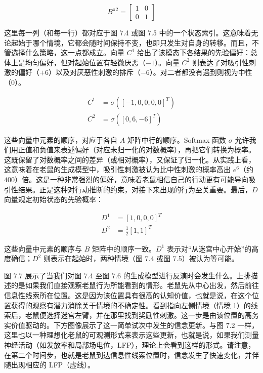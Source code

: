 \begin{equation}
B^{\pi 2}=
\begin{bmatrix}
1 & 0 \\
0 & 1
\end{bmatrix}
\label{eq:chapter7-context}
\end{equation}

这里每一列（和每一行）都对应于图 7.4 或图 7.5 中的一个状态索引。这意味着无论起始于哪个情境，它都会随时间保持不变，也即只发生对自身的转移。而且，不管选择什么策略，这一点都成立。向量 $C^1$ 给出了该模态下各结果的先验偏好：总体上是均匀偏好，但对起始位置有轻微厌恶（$-1$）。向量 $C^2$ 则表达了对吸引性刺激的偏好（$+6$）以及对厌恶性刺激的排斥（$-6$）。对二者都没有遇到则视为中性（$0$）。

\begin{equation}
\begin{aligned}
C^1 &= \sigma\!\left([-1,0,0,0,0]^T\right) \\
C^2 &= \sigma\!\left([0,6,-6]^T\right)
\end{aligned}
\label{eq:chapter7-C}
\end{equation}

这些向量中元素的顺序，对应于各自 $A$ 矩阵中行的顺序。Softmax 函数 $\sigma$ 允许我们用正值和负值来表述偏好（对应未归一化的对数概率），再把它们转换为概率。这既保留了对数概率之间的差异（或相对概率），又保证了归一化。从实践上看，这意味着在老鼠的生成模型中，吸引性刺激被认为比中性刺激的概率高出 $e^6$（约 $400$）倍。这是一种非常强烈的偏好，意味着老鼠相信自己的行动更有可能导向吸引性结果。正是这种对行动推断的约束，对接下来出现的行为至关重要。最后，$D$ 向量规定初始状态的先验概率：

\begin{equation}
\begin{aligned}
D^1 &= [1,0,0,0]^T \\
D^2 &= \frac{1}{2}[1,1]^T
\end{aligned}
\label{eq:chapter7-D2}
\end{equation}

这些向量中元素的顺序与 $B$ 矩阵中的顺序一致。$D^1$ 表示对“从迷宫中心开始”的高度确信；$D^2$ 则表示在起始时，两种情境（图 7.4 或图 7.5）被认为等可能。

图 7.7 展示了当我们对图 7.4 至图 7.6 的生成模型进行反演时会发生什么。上排描述的是如果我们直接观察老鼠行为所能看到的情形。老鼠先从中心出发，然后前往信息性线索所在位置。这是因为该位置具有很高的认知价值，也就是说，在这个位置获得的观察有潜力消除关于情境的不确定性。看到指向左侧情境（情境 1）的线索后，老鼠便选择迷宫左臂，并在那里找到奖励性刺激。这一步是由该位置的高务实价值驱动的。下方图像展示了这一简单试次中发生的信念更新。与图 7.2 一样，这里也以一种理想化老鼠的可观测形式来表示这些更新，也就是说，如果我们测量神经活动（如发放率和局部场电位，LFP），理论上会看到这样的形式。请注意，在第二个时间步，也就是老鼠到达信息性线索位置时，信念发生了快速变化，并伴随出现相应的 LFP（虚线）。

